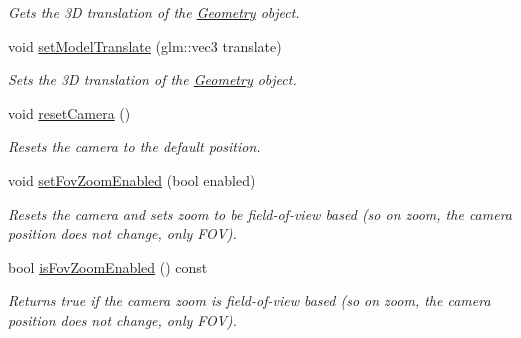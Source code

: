 \begin{DoxyCompactItemize}
\begin{DoxyCompactList}\small\item\em Gets the 3D translation of the \mbox{\hyperlink{classpepr3d_1_1_geometry}{Geometry}} object. \end{DoxyCompactList}\item 
\mbox{\label{classpepr3d_1_1_model_view_a746d83e4e97ca487e3c78c4576b808d9}} 
void \mbox{\hyperlink{classpepr3d_1_1_model_view_a746d83e4e97ca487e3c78c4576b808d9}{set\+Model\+Translate}} (glm\+::vec3 translate)
\begin{DoxyCompactList}\small\item\em Sets the 3D translation of the \mbox{\hyperlink{classpepr3d_1_1_geometry}{Geometry}} object. \end{DoxyCompactList}\item 
\mbox{\label{classpepr3d_1_1_model_view_a2fc846e84bbc088d430d65d29dabb663}} 
void \mbox{\hyperlink{classpepr3d_1_1_model_view_a2fc846e84bbc088d430d65d29dabb663}{reset\+Camera}} ()
\begin{DoxyCompactList}\small\item\em Resets the camera to the default position. \end{DoxyCompactList}\item 
\mbox{\label{classpepr3d_1_1_model_view_afc02d10fd1a5a0607a6a494475139993}} 
void \mbox{\hyperlink{classpepr3d_1_1_model_view_afc02d10fd1a5a0607a6a494475139993}{set\+Fov\+Zoom\+Enabled}} (bool enabled)
\begin{DoxyCompactList}\small\item\em Resets the camera and sets zoom to be field-\/of-\/view based (so on zoom, the camera position does not change, only F\+OV). \end{DoxyCompactList}\item 
\mbox{\label{classpepr3d_1_1_model_view_a9d6337d9cc434235ed959b6efb22ca83}} 
bool \mbox{\hyperlink{classpepr3d_1_1_model_view_a9d6337d9cc434235ed959b6efb22ca83}{is\+Fov\+Zoom\+Enabled}} () const
\begin{DoxyCompactList}\small\item\em Returns true if the camera zoom is field-\/of-\/view based (so on zoom, the camera position does not change, only F\+OV). \end{DoxyCompactList}\item 

\end{DoxyCompactItemize}
